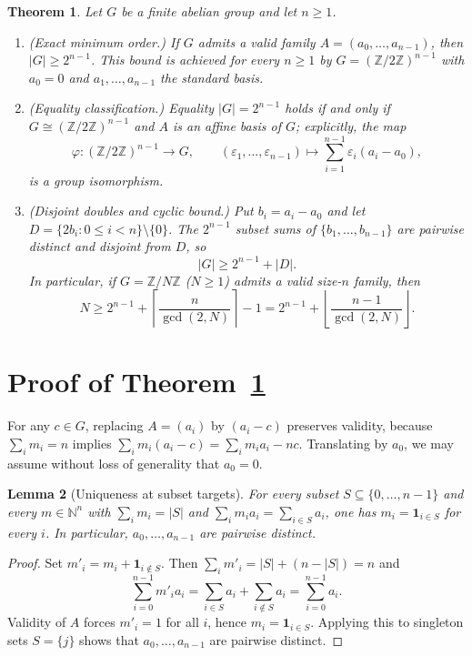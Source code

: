 \documentclass[11pt]{article}
\newtheorem{theorem}{Theorem}
\newtheorem{lemma}[theorem]{Lemma}
\begin{document}
\begin{theorem}\label{thm:main}
Let $G$ be a finite abelian group and let $n \ge 1$.
\begin{enumerate}
\item \emph{(Exact minimum order.)} If $G$ admits a valid family $A = (a_0, \dots, a_{n-1})$, then $|G| \ge 2^{n-1}$. This bound is achieved for every $n \ge 1$ by $G = (\mathbb{Z}/2\mathbb{Z})^{n-1}$ with $a_0 = 0$ and $a_1, \dots, a_{n-1}$ the standard basis.
\item \emph{(Equality classification.)} Equality $|G| = 2^{n-1}$ holds if and only if $G \cong (\mathbb{Z}/2\mathbb{Z})^{n-1}$ and $A$ is an affine basis of $G$; explicitly, the map
\[
\varphi : (\mathbb{Z}/2\mathbb{Z})^{n-1} \longrightarrow G, \qquad (\varepsilon_1, \dots, \varepsilon_{n-1}) \longmapsto \sum_{i=1}^{n-1} \varepsilon_i (a_i - a_0),
\]
is a group isomorphism.
\item \emph{(Disjoint doubles and cyclic bound.)} Put $b_i = a_i - a_0$ and let $D = \{2b_i : 0 \le i < n\} \setminus \{0\}$. The $2^{n-1}$ subset sums of $\{b_1, \dots, b_{n-1}\}$ are pairwise distinct and disjoint from $D$, so
\[
|G| \ge 2^{n-1} + |D|.
\]
In particular, if $G = \mathbb{Z}/N\mathbb{Z}$ ($N \ge 1$) admits a valid size-$n$ family, then
\[
N \ge 2^{n-1} + \left\lceil \frac{n}{\gcd(2, N)} \right\rceil - 1 = 2^{n-1} + \left\lfloor \frac{n - 1}{\gcd(2, N)} \right\rfloor.
\]
\end{enumerate}
\end{theorem}

\section{Proof of Theorem~\ref{thm:main}}
For any $c \in G$, replacing $A = (a_i)$ by $(a_i - c)$ preserves validity, because $\sum_i m_i = n$ implies $\sum_i m_i(a_i - c) = \sum_i m_i a_i - nc$. Translating by $a_0$, we may assume without loss of generality that $a_0 = 0$.

\begin{lemma}[Uniqueness at subset targets]\label{lem:subset}
For every subset $S \subseteq \{0, \dots, n-1\}$ and every $m \in \mathbb{N}^n$ with $\sum_i m_i = |S|$ and $\sum_i m_i a_i = \sum_{i \in S} a_i$, one has $m_i = \mathbf{1}_{i \in S}$ for every $i$. In particular, $a_0, \dots, a_{n-1}$ are pairwise distinct.
\end{lemma}
\begin{proof}
Set $m'_i = m_i + \mathbf{1}_{i \notin S}$. Then $\sum_i m'_i = |S| + (n - |S|) = n$ and
\[
\sum_{i=0}^{n-1} m'_i a_i = \sum_{i \in S} a_i + \sum_{i \notin S} a_i = \sum_{i=0}^{n-1} a_i.
\]
Validity of $A$ forces $m'_i = 1$ for all $i$, hence $m_i = \mathbf{1}_{i \in S}$. Applying this to singleton sets $S = \{j\}$ shows that $a_0, \dots, a_{n-1}$ are pairwise distinct.
\end{proof}
\end{document}
